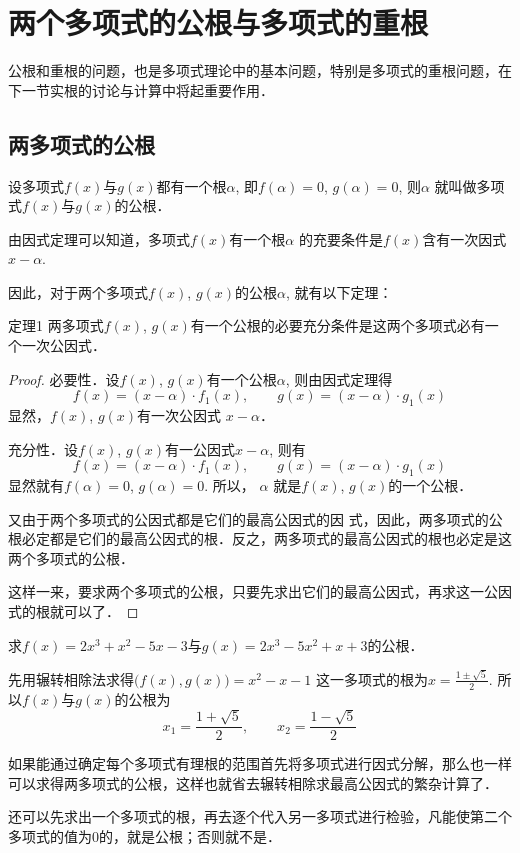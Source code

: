 \section{两个多项式的公根与多项式的重根}
公根和重根的问题，也是多项式理论中的基本问题，特别是多项式的重根问题，在下一节实根的讨论与计算中将起重要作用．

\subsection{两多项式的公根} 
设多项式$f(x)$与$g(x)$都有一个根$\alpha$, 即$f(\alpha )=0$, $g(\alpha )=0$, 则$\alpha$ 就叫做多项式$f(x)$与$g(x)$的公根．

由因式定理可以知道，多项式$f(x)$有一个根$\alpha$ 的充要条件是$f(x)$含有一次因式$x-\alpha$.

因此，对于两个多项式$f(x)$, $g(x)$的公根$\alpha$, 就有以下定理：

\begin{blk}{定理1}
    两多项式$f(x)$, $g(x)$有一个公根的必要充分条件是这两个多项式必有一个一次公因式．
\end{blk}

\begin{proof}
    必要性．设$f(x)$, $g(x)$有一个公根$\alpha$, 则由因式定理得
\[f (x) = (x-\alpha ) \cdot f_1 (x),\qquad g(x)=(x-\alpha )\cdot g_1 (x)\]
显然，$f(x)$, $g(x)$有一次公因式 $x-\alpha$．

充分性．设$f(x)$, $g(x)$有一公因式$x-\alpha$, 则有
\[f (x) = (x-\alpha ) \cdot f_1 (x),\qquad g (x) = (x-\alpha ) \cdot g_1 (x)\]
显然就有$f(\alpha )=0$, $g(\alpha )=0$. 所以，
$\alpha$ 就是$f(x)$, $g(x)$的一个公根．

又由于两个多项式的公因式都是它们的最高公因式的因
式，因此，两多项式的公根必定都是它们的最高公因式的根．反之，两多项式的最高公因式的根也必定是这两个多项式的公根．

这样一来，要求两个多项式的公根，只要先求出它们的最高公因式，再求这一公因式的根就可以了．
\end{proof}

\begin{example}
    求$f(x)=2x^3+x^2-5x-3$与$g(x)=2x^3-5x^2+x+3$的公根．
\end{example}

\begin{solution}
    先用辗转相除法求得$\big(f (x) ,g (x) \big) =x^2-x-1$
    这一多项式的根为$x=\frac{1\pm\sqrt{5}}{2}$. 所以$f(x)$与$g(x)$的公根为
\[x_1=\frac{1+\sqrt{5}}{2},\qquad x_2=\frac{1-\sqrt{5}}{2}\]
    
    如果能通过确定每个多项式有理根的范围首先将多项式进行因式分解，那么也一样可以求得两多项式的公根，这样也就省去辗转相除求最高公因式的繁杂计算了．

    还可以先求出一个多项式的根，再去逐个代入另一多项式进行检验，凡能使第二个多项式的值为0的，就是公根；否则就不是．
\end{solution}

